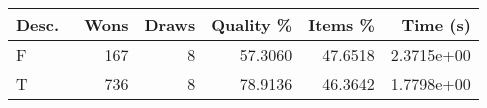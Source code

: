 \begin{tabular}{lrrrrr}
    \hline
    Desc.\  & Wons & Draws & Quality \% & Items \% & Time (s)   \\
    \hline
    F      & 167  & 8     & 57.3060    & 47.6518  & 2.3715e+00 \\
    T      & 736  & 8     & 78.9136    & 46.3642  & 1.7798e+00 \\
    \hline
\end{tabular}